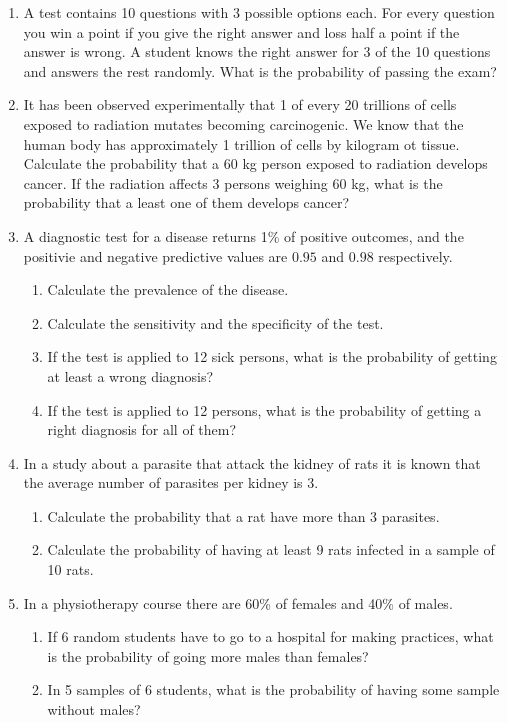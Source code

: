 \begin{enumerate}[leftmargin=*,resume]
\item A test contains 10 questions with 3 possible options each. 
For every question you win a point if you give the right answer and loss half a point if the answer is wrong. 
A student knows the right answer for 3 of the 10 questions and answers the rest randomly. 
What is the probability of passing the exam?

\item It has been observed experimentally that 1 of every 20 trillions of cells exposed to radiation mutates becoming
carcinogenic. 
We know that the human body has approximately 1 trillion of cells by kilogram ot tissue. 
Calculate the probability that a 60 kg person exposed to radiation develops cancer.
If the radiation affects 3 persons weighing 60 kg, what is the probability that a least one of them develops cancer?

\item A diagnostic test for a disease returns 1\% of positive outcomes, and the positivie and negative predictive values
are $0.95$ and $0.98$ respectively. 
\begin{enumerate}
\item Calculate the prevalence of the disease.
\item Calculate the sensitivity and the specificity of the test.
\item If the test is applied to 12 sick persons, what is the probability of getting at least a wrong diagnosis?
\item If the test is applied to 12 persons, what is the probability of getting a right diagnosis for all of them?
\end{enumerate}

\item In a study about a parasite that attack the kidney of rats it is known that the average number of parasites per
kidney is 3. 
\begin{enumerate}
\item Calculate the probability that a rat have more than 3 parasites.
\item Calculate the probability of having at least 9 rats infected in a sample of 10 rats. 
\end{enumerate}

\item In a physiotherapy course there are 60\% of females and 40\% of males.
\begin{enumerate}
\item If 6 random students have to go to a hospital for making practices, what is the probability of going more males
than females?
\item In 5 samples of 6 students, what is the probability of having some sample without males?
\end{enumerate}

\end{enumerate}


